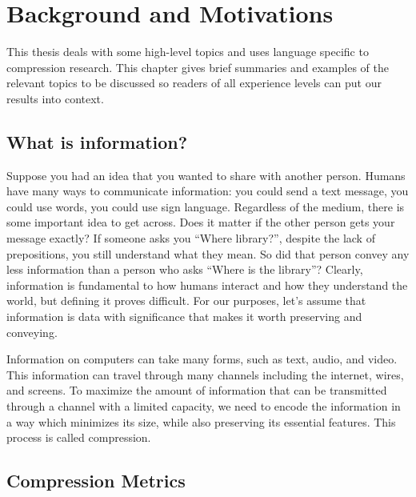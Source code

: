 \documentclass[12pt,twoside]{reedthesis}
\begin{document}
\mainmatter %
\pagestyle{fancyplain} %

\hypertarget{background-and-motivations}{%
\chapter{Background and Motivations}\label{background-and-motivations}}

This thesis deals with some high-level topics and uses language specific to compression research. This chapter gives brief summaries and examples of the relevant topics to be discussed so readers of all experience levels can put our results into context.

\hypertarget{what-is-information}{%
\section{What is information?}\label{what-is-information}}

Suppose you had an idea that you wanted to share with another person. Humans have many ways to communicate information: you could send a text message, you could use words, you could use sign language. Regardless of the medium, there is some important idea to get across. Does it matter if the other person gets your message exactly? If someone asks you ``Where library?'', despite the lack of prepositions, you still understand what they mean. So did that person convey any less information than a person who asks ``Where is the library''?
Clearly, information is fundamental to how humans interact and how they understand the world, but defining it proves difficult. For our purposes, let's assume that information is data with significance that makes it worth preserving and conveying.

Information on computers can take many forms, such as text, audio, and video. This information can travel through many channels including the internet, wires, and screens. To maximize the amount of information that can be transmitted through a channel with a limited capacity, we need to encode the information in a way which minimizes its size, while also preserving its essential features. This process is called compression.

\hypertarget{compression-metrics}{%
\section{Compression Metrics}\label{compression-metrics}}
\end{document}
